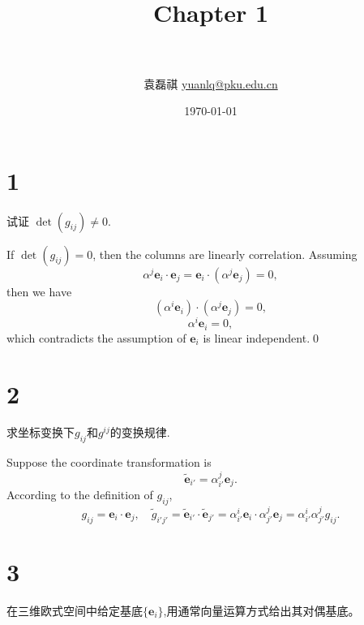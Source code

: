 \documentclass[a4,12pt]{ctexart}
\title{
   \vspace{-0.8in}
   \horrule{0.5pt} \\[0.5cm]
   \huge \bfseries{Chapter 1} \\
   \horrule{2pt} \\[0.5cm]
}
\author{袁磊祺 \quad \href{mailto:yuanlq@pku.edu.cn}{yuanlq@pku.edu.cn}}
\date{\today}
\begin{document}


\maketitle

\section{1}

试证 $\det (g_{ij}) \neq  0$.

If $\det (g_{ij}) = 0$, then the columns are linearly correlation. Assuming
\begin{equation}
   \alpha^j \bm{e}_i \cdot \bm{e}_j =   \bm{e}_i \cdot (\alpha^j \bm{e}_j) = 0,
\end{equation}
then we have
\begin{equation}
   (\alpha^i \bm{e}_i) \cdot (\alpha^j \bm{e}_j) = 0,
\end{equation}
\begin{equation}
   \alpha^i \bm{e}_i = 0,
\end{equation}
which contradicts the assumption of $\bm{e}_i $ is linear independent.\qed


\section{2}
求坐标变换下$g_{ij}$和$g^{ij}$的变换规律.

Suppose the coordinate transformation is
\begin{equation}
   \widetilde{\bm{e}}_{i'} = \alpha_{i'}^{j} \bm{e}_j.
\end{equation}
According to the definition of $g_{ij}$,
\begin{equation}
   g_{ij} = \bm{e}_i \cdot \bm{e}_j, \quad  \widetilde{g}_{i'j'} = \widetilde{\bm{e}}_{i'} \cdot \widetilde{\bm{e}}_{j'} = \alpha_{i'}^{i} \bm{e}_i \cdot \alpha_{j'}^{j} \bm{e}_j =   \alpha_{i'}^{i}  \alpha_{j'}^{j} g_{ij}.
\end{equation}


\section{3}

在三维欧式空间中给定基底$\{\bm{e}_i\}$,用通常向量运算方式给出其对偶基底。




% 
% 
\end{document}
